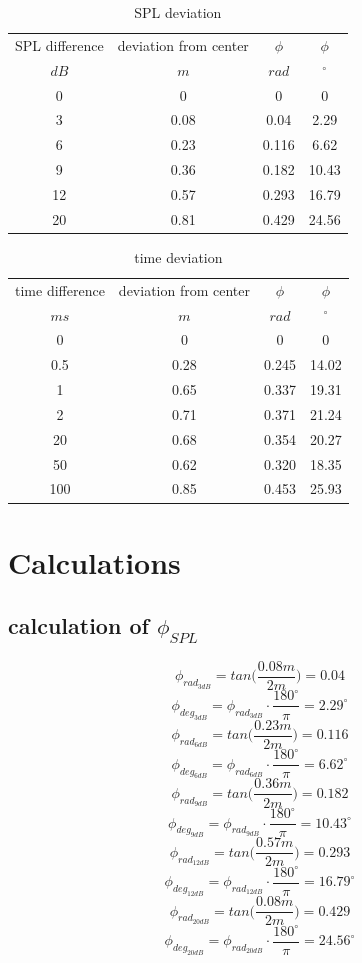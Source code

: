 \documentclass{article}
\begin{document}
\begin{table}
\begin{center}
\begin{tabular}{|c||c||c|c|}
\hline
SPL difference & deviation from center & $\phi$ & $\phi$ \\
$dB$	&	$m$	&	$rad$	&	$^\circ$		\\
\hline
\hline
0 & 0 & 0 & 0\\
\hline
3 & 0.08 & 0.04 & 2.29 \\
\hline
6 & 0.23 & 0.116 & 6.62\\
\hline
9 & 0.36 & 0.182 & 10.43\\
\hline
12 & 0.57 & 0.293 & 16.79\\
\hline
20 & 0.81 & 0.429 & 24.56\\
\hline
\end{tabular}
\caption{SPL deviation}
\label{tab:SPL}
\end{center}
\end{table}

\begin{table}
\begin{center}
\begin{tabular}{|c||c||c|c|}
\hline
time difference & deviation from center & $\phi$ & $\phi$ \\
$ms$	&	$m$	&	$rad$	&	$^\circ$		\\
\hline
\hline
0 & 0 & 0 & 0\\
\hline
0.5 & 0.28 & 0.245 & 14.02\\
\hline
1 & 0.65 & 0.337 & 19.31\\
\hline
2 & 0.71 & 0.371 & 21.24\\
\hline
20 & 0.68 & 0.354 & 20.27\\
\hline
50 & 0.62 & 0.320 & 18.35\\
\hline
100 & 0.85 & 0.453 & 25.93\\
\hline
\end{tabular}
\caption{time deviation}
\label{tab:time}
\end{center}
\end{table}

\section{Calculations}
\subsection{calculation of $\phi_{SPL}$}
$$\phi_{rad_{3dB}}=tan\bigg(\frac{0.08m}{2m}\bigg)=0.04$$
$$\phi_{deg_{3dB}}=\phi_{rad_{3dB}}\cdot\frac{180^\circ}{\pi}=2.29^\circ$$
$$\phi_{rad_{6dB}}=tan\bigg(\frac{0.23m}{2m}\bigg)=0.116$$
$$\phi_{deg_{6dB}}=\phi_{rad_{6dB}}\cdot\frac{180^\circ}{\pi}=6.62^\circ$$
$$\phi_{rad_{9dB}}=tan\bigg(\frac{0.36m}{2m}\bigg)=0.182$$
$$\phi_{deg_{9dB}}=\phi_{rad_{9dB}}\cdot\frac{180^\circ}{\pi}=10.43^\circ$$
$$\phi_{rad_{12dB}}=tan\bigg(\frac{0.57m}{2m}\bigg)=0.293$$
$$\phi_{deg_{12dB}}=\phi_{rad_{12dB}}\cdot\frac{180^\circ}{\pi}=16.79^\circ$$
$$\phi_{rad_{20dB}}=tan\bigg(\frac{0.08m}{2m}\bigg)=0.429$$
$$\phi_{deg_{20dB}}=\phi_{rad_{20dB}}\cdot\frac{180^\circ}{\pi}=24.56^\circ$$
\end{document}
